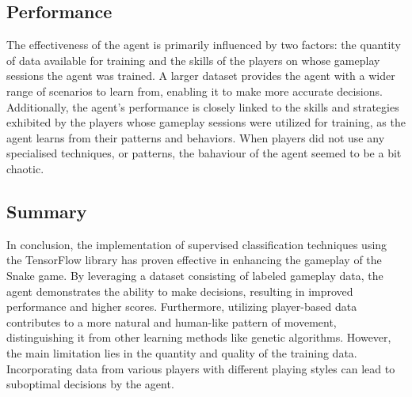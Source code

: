 \subsection{Performance}
The effectiveness of the agent is primarily influenced by two factors: the quantity of data available for training and the skills of the players on whose gameplay sessions the agent was trained. A larger dataset provides the agent with a wider range of scenarios to learn from, enabling it to make more accurate decisions. Additionally, the agent's performance is closely linked to the skills and strategies exhibited by the players whose gameplay sessions were utilized for training, as the agent learns from their patterns and behaviors. When players did not use any specialised techniques, or patterns, the bahaviour of the agent seemed to be a bit chaotic.

\subsection{Summary}
In conclusion, the implementation of supervised classification techniques using the TensorFlow library has proven effective in enhancing the gameplay of the Snake game. By leveraging a dataset consisting of labeled gameplay data, the agent demonstrates the ability to make decisions, resulting in improved performance and higher scores. Furthermore, utilizing player-based data contributes to a more natural and human-like pattern of movement, distinguishing it from other learning methods like genetic algorithms. However, the main limitation lies in the quantity and quality of the training data. Incorporating data from various players with different playing styles can lead to suboptimal decisions by the agent.